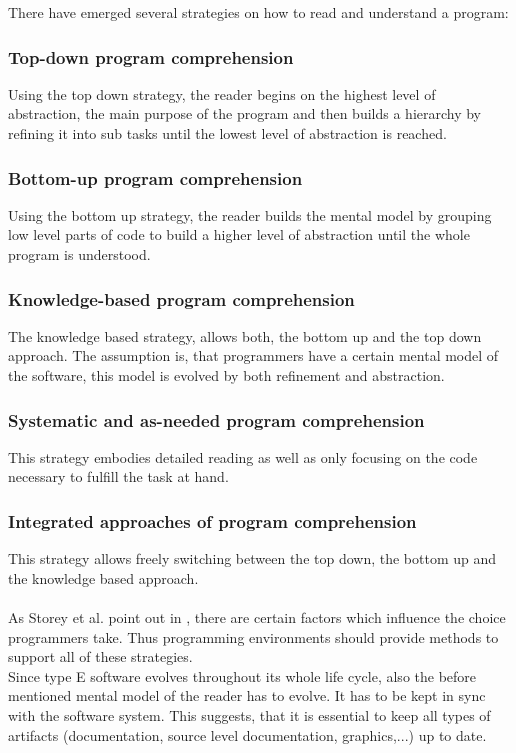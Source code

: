 There have emerged several strategies on how to read and understand a program\cite{Storey:1999:CDE:308936.308940}\cite{Storey:1997:PUT:832304.836998}:
\subsubsection*{Top-down program comprehension}
Using the top down strategy, the reader begins on the highest level of abstraction, the main purpose of the program and then builds a hierarchy by refining it into sub tasks until the lowest level of abstraction is reached.
\subsubsection*{Bottom-up program comprehension} Using the bottom up strategy, the reader builds the mental model by grouping low level parts of code to build a higher level of abstraction until the whole program is understood.
\subsubsection*{Knowledge-based program comprehension} The knowledge based strategy, allows both, the bottom up and the top down approach. The assumption is, that programmers have a certain mental model of the software, this model is evolved by both refinement and abstraction.
\subsubsection*{Systematic and as-needed program comprehension} This strategy embodies detailed reading as well as only focusing on the code necessary to fulfill the task at hand.
\subsubsection*{Integrated approaches of program comprehension} This strategy allows freely switching between the top down, the bottom up and the knowledge based approach.
\\\\
As Storey et al. point out in \cite{Storey:1999:CDE:308936.308940}, there are certain factors which influence the choice programmers take. Thus programming environments should provide methods to support all of these strategies.
\\
Since type E software evolves throughout its whole life cycle, also the before mentioned mental model of the reader has to evolve. It has to be kept in sync with the software system. This suggests, that it is essential to keep all types of artifacts (documentation, source level documentation, graphics,...) up to date.

